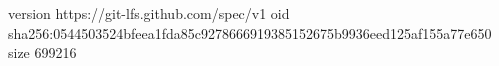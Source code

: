 version https://git-lfs.github.com/spec/v1
oid sha256:0544503524bfeea1fda85c9278666919385152675b9936eed125af155a77e650
size 699216
